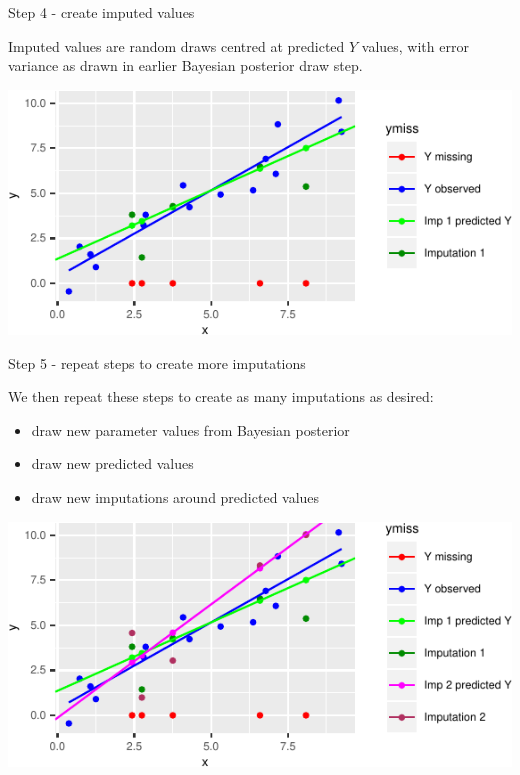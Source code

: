 \documentclass[ignorenonframetext,]{beamer}
\providecommand{\tightlist}{%
  \setlength{\itemsep}{0pt}\setlength{\parskip}{0pt}}
\begin{document}
\begin{frame}{Step 4 - create imputed values}
\protect\hypertarget{step-4---create-imputed-values}{}

Imputed values are random draws centred at predicted \(Y\) values, with
error variance as drawn in earlier Bayesian posterior draw step.

\begin{center}\includegraphics{Lecture2_files/figure-beamer/unnamed-chunk-21-1} \end{center}

\end{frame}

\begin{frame}{Step 5 - repeat steps to create more imputations}
\protect\hypertarget{step-5---repeat-steps-to-create-more-imputations}{}

We then repeat these steps to create as many imputations as desired:

\begin{itemize}
\tightlist
\item
  draw new parameter values from Bayesian posterior
\item
  draw new predicted values
\item
  draw new imputations around predicted values
\end{itemize}

\begin{center}\includegraphics{Lecture2_files/figure-beamer/unnamed-chunk-23-1} \end{center}

\end{frame}
\end{document}
